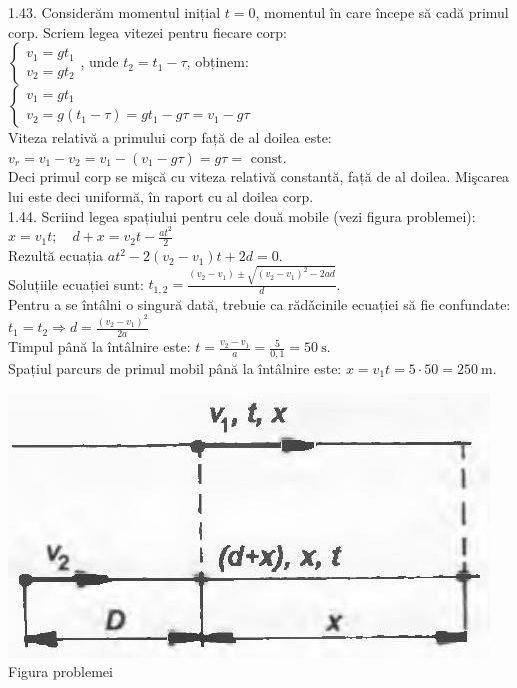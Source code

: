 1.43. Considerăm momentul inițial $t=0$, momentul în care începe să cadă primul corp. Scriem legea vitezei pentru fiecare corp:\\ $\left\{\begin{array}{l} v_{1}=g t_{1}\\ v_{2}=g t_{2} \end{array}\right.$, unde $t_{2}=t_{1}-\tau$, obținem:\\ $\left\{\begin{array}{l} v_{1}=g t_{1}\\ v_{2}=g\left(t_{1}-\tau\right)=g t_{1}-g \tau=v_{1}-g \tau \end{array}\right.$\\ Viteza relativă a primului corp față de al doilea este:\\ $v_{r}=v_{1}-v_{2}=v_{1}-\left(v_{1}-g \tau\right)=g \tau=\text { const. }$\\ Deci primul corp se mişcă cu viteza relativă constantă, față de al doilea. Mişcarea lui este deci uniformă, în raport cu al doilea corp.\\

1.44. Scriind legea spațiului pentru cele două mobile (vezi figura problemei):\\ $x=v_{1} t; \quad d+x=v_{2} t-\frac{a t^{2}}{2}$\\ Rezultă ecuația $a t^{2}-2\left(v_{2}-v_{1}\right) t+2 d=0$.\\ Soluțiile ecuației sunt: $t_{1,2}=\frac{\left(v_{2}-v_{1}\right) \pm \sqrt{\left(v_{2}-v_{1}\right)^{2}-2 a d}}{d}$.\\ Pentru a se întâlni o singură dată, trebuie ca rădǎcinile ecuației să fie confundate: $t_{1}=t_{2} \Rightarrow d=\frac{\left(v_{2}-v_{1}\right)^{2}}{2 a}$\\ Timpul până la întâlnire este: $t=\frac{v_{2}-v_{1}}{a}=\frac{5}{0,1}=50 \mathrm{~s}$.\\ Spațiul parcurs de primul mobil până la întâlnire este: $x=v_{1} t=5 \cdot 50=250 \mathrm{~m}$.\\ \begin{center} \includegraphics[width=0.4\linewidth]{images/2025_07_01_5b3ff9fa0d508c8e9f17g-206(1)}\\ Figura problemei \end{center}\\

